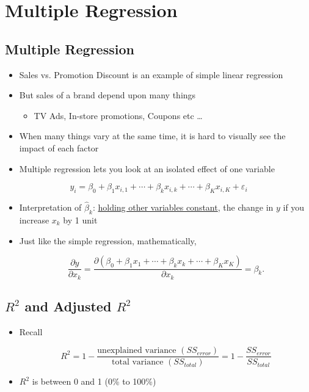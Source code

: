 \documentclass[10pt,article]{article}
\begin{document}
\section{Multiple Regression}
\label{sec:org3a847bb}
\subsection{Multiple Regression}
\label{sec:orgdb80cd8}
\begin{itemize}
\item Sales vs. Promotion Discount is an example of simple linear regression
\item But sales of a brand depend upon many things
\begin{itemize}
\item TV Ads, In-store promotions, Coupons etc \ldots{}
\end{itemize}

\item When many things vary at the same time, it is hard to visually see the
impact of each factor
\item Multiple regression lets you look at an isolated effect of one variable
\end{itemize}

\[ y_{i} = \beta_0 + \beta_1 x_{i, 1} + \cdots + \beta_k x_{i, k} + \cdots +
\beta_K x_{i, K} + \varepsilon_{i} \]

\begin{itemize}
\item Interpretation of \(\hat{\beta}_k\): \uline{holding other variables constant}, the
change in \(y\) if you increase \(x_k\) by 1 unit

\item Just like the simple regression, mathematically,

\[ \dfrac{\partial y}{\partial x_k} = \dfrac{\partial ( \beta_0 + \beta_1 x_1 + \cdots + \beta_k
  x_k + \cdots + \beta_K x_K) }{\partial x_k } = \beta_k. \]
\end{itemize}

\subsection{\(R^2\) and Adjusted \(R^2\)}
\label{sec:orgf6fb29f}
\begin{itemize}
\item Recall

\[
     R^2 = 1 - \dfrac{\text{unexplained variance } (SS_{error})}
           {\text{total variance } (SS_{total})} = 1 - \dfrac{SS_{error}}{SS_{total}}
  \]

\item \(R^2\) is between 0 and 1 (0\% to 100\%)
\end{itemize}
\end{document}
